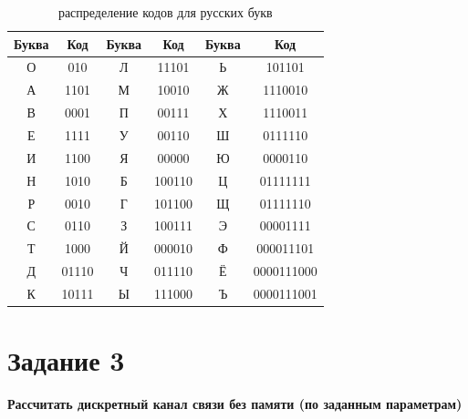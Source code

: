 \documentclass[a4paper,12pt]{article}
\begin{document}
  \begin{table}[H]
    \centering
    \begin{tabular}{| c | c | c | c | c | c |}
      \hline
      Буква & Код & Буква & Код & Буква & Код \\
      \hline
      О & 010 & Л & 11101 & Ь & 101101 \\
      А & 1101 & М & 10010 & Ж & 1110010 \\
      В & 0001 & П & 00111 & Х & 1110011 \\
      Е & 1111 & У & 00110 & Ш & 0111110 \\
      И & 1100 & Я & 00000 & Ю & 0000110 \\
      Н & 1010 & Б & 100110 & Ц & 01111111 \\
      Р & 0010 & Г & 101100 & Щ & 01111110 \\
      С & 0110 & З & 100111 & Э & 00001111 \\
      Т & 1000 & Й & 000010 & Ф & 000011101 \\
      Д & 01110 & Ч & 011110 & Ё & 0000111000 \\
      К & 10111 & Ы & 111000 & Ъ & 0000111001 \\
      \hline
    \end{tabular}
    \caption{распределение кодов для русских букв}
  \end{table}
  \pagebreak
  \section*{Задание 3}

  \textbf{Рассчитать дискретный канал связи без памяти (по заданным параметрам)}
\end{document}
